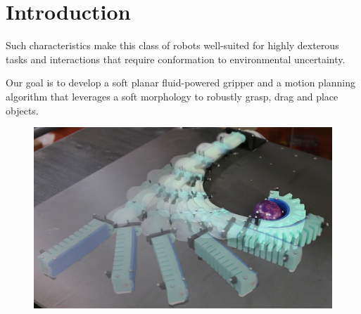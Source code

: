 \section{Introduction}

Such characteristics make this class of robots well-suited for highly dexterous tasks and interactions that require conformation to environmental uncertainty.

Our goal is to develop a soft planar fluid-powered gripper and a motion planning algorithm that leverages a soft morphology to robustly grasp, drag and place objects. 

\begin{figure}[htb]
\centering
   \includegraphics[width=0.9\columnwidth]{Figures/experimental_results/egg_approach/egg_approach_sequence}
   \caption{}
   \label{fig:egg_approach_sequence}
\end{figure}

